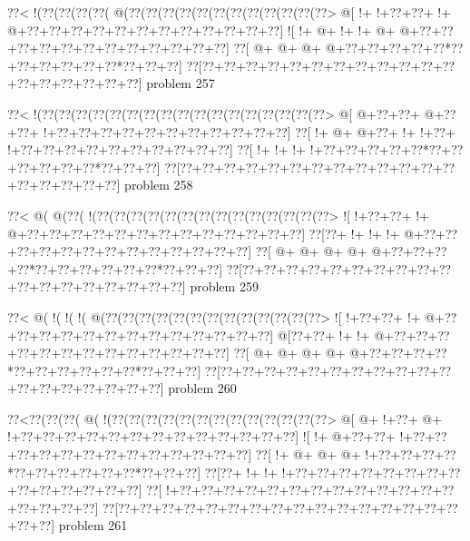 \vbox{\vbox{\goo
\0??<\- !(\0??(\0??(\0??(\0??(\- @(\0??(\0??(\0??(\0??(\0??(\0??(\0??(\0??(\0??(\0??(\0??(\0??>
\- @[\- !+\- !+\0??+\0??+\- !+\- @+\0??+\0??+\0??+\0??+\0??+\0??+\0??+\0??+\0??+\0??+\0??+\0??]
\- ![\- !+\- @+\- !+\- !+\- @+\- @+\0??+\0??+\0??+\0??+\0??+\0??+\0??+\0??+\0??+\0??+\0??+\0??]
\0??[\- @+\- @+\- @+\- @+\0??+\0??+\0??+\0??+\0??*\0??+\0??+\0??+\0??+\0??+\0??*\0??+\0??+\0??]
\0??[\0??+\0??+\0??+\0??+\0??+\0??+\0??+\0??+\0??+\0??+\0??+\0??+\0??+\0??+\0??+\0??+\0??+\0??]
}
\hfil problem 257\hfil\break
}



\vbox{\vbox{\goo
\0??<\- !(\0??(\0??(\0??(\0??(\0??(\0??(\0??(\0??(\0??(\0??(\0??(\0??(\0??(\0??(\0??(\0??(\0??>
\- @[\- @+\0??+\0??+\- @+\0??+\0??+\- !+\0??+\0??+\0??+\0??+\0??+\0??+\0??+\0??+\0??+\0??+\0??]
\0??[\- !+\- @+\- @+\0??+\- !+\- !+\0??+\- !+\0??+\0??+\0??+\0??+\0??+\0??+\0??+\0??+\0??+\0??]
\0??[\- !+\- !+\- !+\- !+\0??+\0??+\0??+\0??+\0??*\0??+\0??+\0??+\0??+\0??+\0??*\0??+\0??+\0??]
\0??[\0??+\0??+\0??+\0??+\0??+\0??+\0??+\0??+\0??+\0??+\0??+\0??+\0??+\0??+\0??+\0??+\0??+\0??]
}
\hfil problem 258\hfil\break
}



\vbox{\vbox{\goo
\0??<\- @(\- @(\0??(\- !(\0??(\0??(\0??(\0??(\0??(\0??(\0??(\0??(\0??(\0??(\0??(\0??(\0??(\0??>
\- ![\- !+\0??+\0??+\- !+\- @+\0??+\0??+\0??+\0??+\0??+\0??+\0??+\0??+\0??+\0??+\0??+\0??+\0??]
\0??[\0??+\- !+\- !+\- !+\- @+\0??+\0??+\0??+\0??+\0??+\0??+\0??+\0??+\0??+\0??+\0??+\0??+\0??]
\0??[\- @+\- @+\- @+\- @+\- @+\0??+\0??+\0??+\0??*\0??+\0??+\0??+\0??+\0??+\0??*\0??+\0??+\0??]
\0??[\0??+\0??+\0??+\0??+\0??+\0??+\0??+\0??+\0??+\0??+\0??+\0??+\0??+\0??+\0??+\0??+\0??+\0??]
}
\hfil problem 259\hfil\break
}



\vbox{\vbox{\goo
\0??<\- @(\- !(\- !(\- !(\- @(\0??(\0??(\0??(\0??(\0??(\0??(\0??(\0??(\0??(\0??(\0??(\0??(\0??>
\- ![\- !+\0??+\0??+\- !+\- @+\0??+\0??+\0??+\0??+\0??+\0??+\0??+\0??+\0??+\0??+\0??+\0??+\0??]
\- @[\0??+\0??+\- !+\- !+\- @+\0??+\0??+\0??+\0??+\0??+\0??+\0??+\0??+\0??+\0??+\0??+\0??+\0??]
\0??[\- @+\- @+\- @+\- @+\- @+\0??+\0??+\0??+\0??*\0??+\0??+\0??+\0??+\0??+\0??*\0??+\0??+\0??]
\0??[\0??+\0??+\0??+\0??+\0??+\0??+\0??+\0??+\0??+\0??+\0??+\0??+\0??+\0??+\0??+\0??+\0??+\0??]
}
\hfil problem 260\hfil\break
}



\vbox{\vbox{\goo
\0??<\0??(\0??(\0??(\- @(\- !(\0??(\0??(\0??(\0??(\0??(\0??(\0??(\0??(\0??(\0??(\0??(\0??(\0??>
\- @[\- @+\- !+\0??+\- @+\- !+\0??+\0??+\0??+\0??+\0??+\0??+\0??+\0??+\0??+\0??+\0??+\0??+\0??]
\- ![\- !+\- @+\0??+\0??+\- !+\0??+\0??+\0??+\0??+\0??+\0??+\0??+\0??+\0??+\0??+\0??+\0??+\0??]
\0??[\- !+\- @+\- @+\- @+\- !+\0??+\0??+\0??+\0??*\0??+\0??+\0??+\0??+\0??+\0??*\0??+\0??+\0??]
\0??[\0??+\- !+\- !+\- !+\0??+\0??+\0??+\0??+\0??+\0??+\0??+\0??+\0??+\0??+\0??+\0??+\0??+\0??]
\0??[\- !+\0??+\0??+\0??+\0??+\0??+\0??+\0??+\0??+\0??+\0??+\0??+\0??+\0??+\0??+\0??+\0??+\0??]
\0??[\0??+\0??+\0??+\0??+\0??+\0??+\0??+\0??+\0??+\0??+\0??+\0??+\0??+\0??+\0??+\0??+\0??+\0??]
}
\hfil problem 261\hfil\break
}



